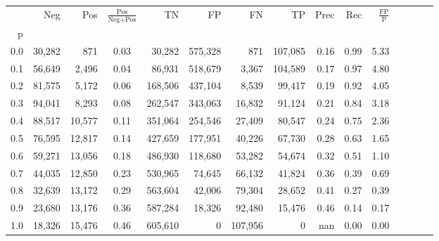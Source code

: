 \begin{tabular}{rrrcrrrrrrrrrrr}
\toprule
{} &     Neg &     Pos & $\frac{\text{Pos}}{\text{Neg}+\text{Pos}}$ &       TN &       FP &       FN &       TP &  Prec &   Rec & $\frac{\text{FP}}{\text{P}}$ \\
p   &         &         &                                            &          &          &          &          &       &       &                              \\
\midrule
0.0 &  30,282 &     871 &                                       0.03 &   30,282 &  575,328 &      871 &  107,085 &  0.16 &  0.99 &                         5.33 \\
0.1 &  56,649 &   2,496 &                                       0.04 &   86,931 &  518,679 &    3,367 &  104,589 &  0.17 &  0.97 &                         4.80 \\
0.2 &  81,575 &   5,172 &                                       0.06 &  168,506 &  437,104 &    8,539 &   99,417 &  0.19 &  0.92 &                         4.05 \\
0.3 &  94,041 &   8,293 &                                       0.08 &  262,547 &  343,063 &   16,832 &   91,124 &  0.21 &  0.84 &                         3.18 \\
0.4 &  88,517 &  10,577 &                                       0.11 &  351,064 &  254,546 &   27,409 &   80,547 &  0.24 &  0.75 &                         2.36 \\
0.5 &  76,595 &  12,817 &                                       0.14 &  427,659 &  177,951 &   40,226 &   67,730 &  0.28 &  0.63 &                         1.65 \\
0.6 &  59,271 &  13,056 &                                       0.18 &  486,930 &  118,680 &   53,282 &   54,674 &  0.32 &  0.51 &                         1.10 \\
0.7 &  44,035 &  12,850 &                                       0.23 &  530,965 &   74,645 &   66,132 &   41,824 &  0.36 &  0.39 &                         0.69 \\
0.8 &  32,639 &  13,172 &                                       0.29 &  563,604 &   42,006 &   79,304 &   28,652 &  0.41 &  0.27 &                         0.39 \\
0.9 &  23,680 &  13,176 &                                       0.36 &  587,284 &   18,326 &   92,480 &   15,476 &  0.46 &  0.14 &                         0.17 \\
1.0 &  18,326 &  15,476 &                                       0.46 &  605,610 &        0 &  107,956 &        0 &   nan &  0.00 &                         0.00 \\
\bottomrule
\end{tabular}
